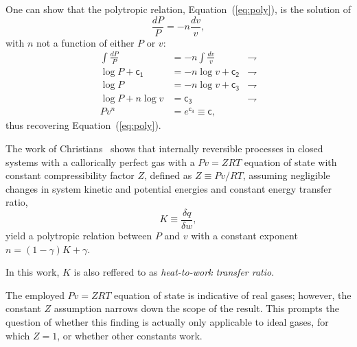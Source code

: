 \documentclass[fleqn,11pt]{SelfArx}
\begin{document}
    One can show that the polytropic relation, Equation~(\ref{eq:poly}), is the solution of
    \begin{equation}
        \frac{dP}{P} = -n\frac{dv}{v},
        \label{eq:poly.ODE}
    \end{equation}
    \noindent with $n$ not a function of either $P$ or $v$:
    \begin{align}
        \int\frac{dP}{P} & = -n\int\frac{dv}{v} & \rightharpoondown
        \\
        \log P + \mathsf{c_1} & = -n\log v + \mathsf{c_2} & \rightharpoondown
        \\
        \log P & = -n\log v + \mathsf{c_3} & \rightharpoondown
        \\
        \log P + n\log v & = \mathsf{c_3} & \rightharpoondown
        \\
        Pv^n & = e^{\mathsf{c_3}} \equiv \mathsf{c},
    \end{align}
    \noindent thus recovering Equation~(\ref{eq:poly}).

    The  work  of  Christians~\cite{2012-ChristiansJ-IntJMechEngEduc}  shows   that   internally
    reversible processes in closed systems with a callorically perfect gas with  a  $Pv  =  ZRT$
    equation of state with constant compressibility factor $Z$, defined  as  $Z  \equiv  Pv/RT$,
    assuming negligible changes in system kinetic and potential  energies  and  constant  energy
    transfer ratio,
    \begin{equation}
        K \equiv \frac{\delta q}{\delta w},
        \label{eq:def.K}
    \end{equation}
    \noindent yield a polytropic relation between $P$ and $v$ with a constant exponent $n = (1 -
    \gamma)K + \gamma$.

    In this work, $K$ is also reffered to as \emph{heat-to-work transfer ratio}.

    The employed $Pv = ZRT$ equation of state is indicative of real gases; however, the constant
    $Z$ assumption narrows down the scope of the result. This prompts the  question  of  whether
    this finding is actually only applicable to ideal gases, for which $Z=1$, or  whether  other
    constants work.
\end{document}

